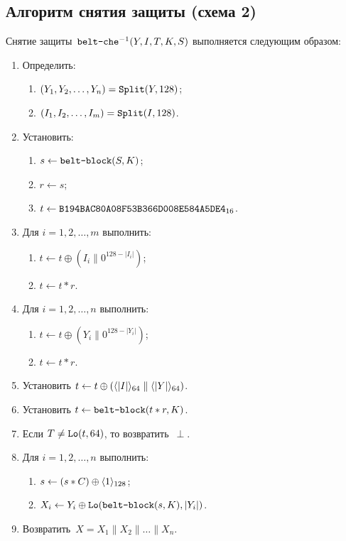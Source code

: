 \subsection{Алгоритм снятия защиты (схема 2)}\label{AE.CHE.Unwrap}

Снятие защиты~$\texttt{belt-che}^{-1}(Y,I,T,K,S)$ выполняется следующим образом:
\begin{enumerate}
\item
Определить: 
\begin{enumerate}
\item
$(Y_1,Y_2,\ldots,Y_n)=\mathop{\texttt{Split}}\nolimits(Y, 128)$;
\item
$(I_1,I_2,\ldots,I_m)=\mathop{\texttt{Split}}\nolimits(I, 128)$. 
\end{enumerate}
\item
Установить:
\begin{enumerate}
\item
$s\leftarrow\texttt{belt-block}(S,K)$;
\item
$r\leftarrow s$;
\item
$t\leftarrow\texttt{B194BAC80A08F53B366D008E584A5DE4}_{16}$.
\end{enumerate}

\item
Для $i=1,2,\ldots,m$ выполнить:
\begin{enumerate}
\item
$t\leftarrow t\oplus (I_i\parallel 0^{128-|I_i|})$;
\item
$t\leftarrow t\ast r$.
\end{enumerate}

\item\label{Step.AE.CHE.StepA}
Для $i=1,2,\ldots,n$ выполнить:
\begin{enumerate}
\item
$t\leftarrow t\oplus (Y_i\parallel 0^{128-|Y_i|})$;
\item
$t\leftarrow t\ast r$.
\end{enumerate}

\item
Установить
$t\leftarrow t\oplus (\langle|I|\rangle_{64}\parallel\langle|Y|\rangle_{64})$.

\item
Установить
$t\leftarrow\texttt{belt-block}(t\ast r,K)$.

\item\label{Step.AE.CHE.VerifyMAC}
Если $T\neq\mathop{\texttt{Lo}}\nolimits(t, 64)$, то возвратить~$\perp$.

\item\label{Step.AE.CHE.StepD}
Для $i=1,2,\ldots,n$ выполнить:
\begin{enumerate}
\item
$s\leftarrow (s\ast C)\oplus\langle1\rangle_{128}$;
\item
$X_i\leftarrow Y_i\oplus \mathop{\texttt{Lo}}\nolimits(\texttt{belt-block}(s,K), |Y_i|)$.
\end{enumerate}
\item
Возвратить~$X=X_1\parallel X_2\parallel\ldots\parallel X_n$.
\end{enumerate}

